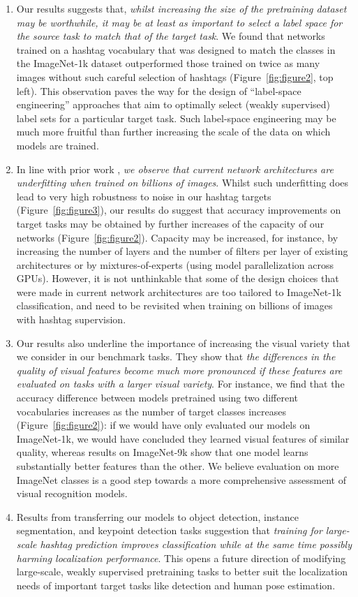 \documentclass[runningheads]{llncs}
\begin{document}
\begin{enumerate}
\item Our results suggests that, \emph{whilst increasing the size of the pretraining dataset may be worthwhile, it may be at least as important to select a label space for the source task to match that of the target task}. We found that networks trained on a hashtag vocabulary that was designed to match the classes in the ImageNet-1k dataset outperformed those trained on twice as many images without such careful selection of hashtags (Figure~\ref{fig:figure2}, top left). This observation paves the way for the design of ``label-space engineering'' approaches that aim to optimally select (weakly supervised) label sets for a particular target task. Such label-space engineering may be much more fruitful than further increasing the scale of the data on which models are trained.
\item In line with prior work \cite{joulin2016learning,sun2017unreasonable}, \emph{we observe that current network architectures are underfitting when trained on billions of images}. Whilst such underfitting does lead to very high robustness to noise in our hashtag targets (Figure~\ref{fig:figure3}), our results do suggest that accuracy improvements on target tasks may be obtained by further increases of the capacity of our networks (Figure~\ref{fig:figure2}). Capacity may be increased, for instance, by increasing the number of layers and the number of filters per layer of existing architectures or by mixtures-of-experts \cite{gross2017hard} (using model parallelization across GPUs). However, it is not unthinkable that some of the design choices that were made in current network architectures are too tailored to ImageNet-1k classification, and need to be revisited when training on billions of images with hashtag supervision.
\item Our results also underline the importance of increasing the visual variety that we consider in our benchmark tasks. They show that \emph{the differences in the quality of visual features become much more pronounced if these features are evaluated on tasks with a larger visual variety}. For instance, we find that the accuracy difference between models pretrained using two different vocabularies increases as the number of target classes increases (Figure~\ref{fig:figure2}): if we would have only evaluated our models on ImageNet-1k, we would have concluded they learned visual features of similar quality, whereas results on ImageNet-9k show that one model learns substantially better features than the other. We believe evaluation on more ImageNet classes is a good step towards a more comprehensive assessment of visual recognition models.
\item Results from transferring our models to object detection, instance segmentation, and keypoint detection tasks suggestion that \emph{training for large-scale hashtag prediction improves classification while at the same time possibly harming localization performance}. This opens a future direction of modifying large-scale, weakly supervised pretraining tasks to better suit the localization needs of important target tasks like detection and human pose estimation.
\end{enumerate}
\end{document}
